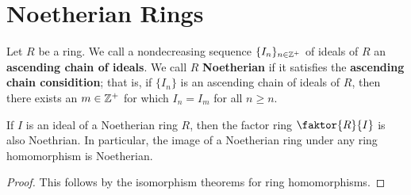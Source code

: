 \section{Noetherian Rings}

\begin{definition}
    Let $R$ be a ring. We call a nondecreasing sequence $\{I_n\}_{n \in \mathbb{Z}^+}$
    of ideals of $R$ an  \textbf{ascending chain of ideals}. We call $R$
    \textbf{Noetherian} if it satisfies the \textbf{ascending chain
    considition}; that is, if $\{I_n\}$ is an ascending chain of ideals of $R$,
    then there exists an $m \in \mathbb{Z}^+$ for which  $I_n=I_m$ for all  $n \geq n$.
\end{definition}

\begin{lemma}\label{1.1.1}
    If $I$ is an ideal of a Noetherian ring  $R$, then the factor ring
    $\faktor{R}{I}$ is also Noethrian. In particular, the image of a Noetherian
    ring under any ring homomorphism is Noetherian.
\end{lemma}
\begin{proof}
    This follows by the isomorphism theorems for ring homomorphisms.
\end{proof}

